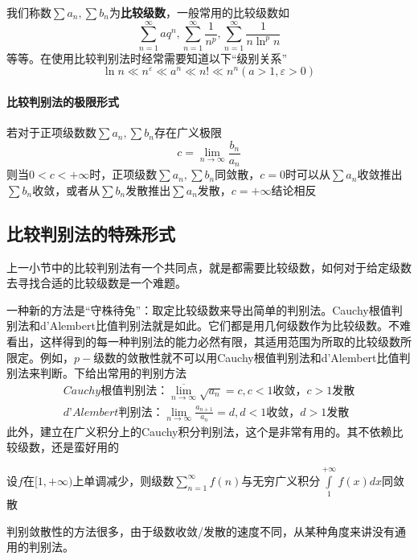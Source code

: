 \documentclass[lang=cn,10pt]{elegantbook}
\begin{document}
我们称数$\sum{a_n},\sum{b_n}$为\textbf{比较级数}，一般常用的比较级数如
\begin{equation*}
	\sum_{n=1}^{\infty}{aq^n},\sum_{n=1}^{\infty}{\frac{1}{n^p},\sum_{n=1}^{\infty}{\frac{1}{n\ln ^pn}}}
\end{equation*}
等等。在使用比较判别法时经常需要知道以下“级别关系”
\begin{equation*}
	\ln n\ll n^{\varepsilon}\ll a^n\ll n!\ll n^n\left( a>1,\varepsilon >0 \right) 
\end{equation*}
\paragraph{比较判别法的极限形式}
若对于正项级数数$\sum{a_n},\sum{b_n}$存在广义极限
\begin{equation*}
	c=\lim_{n\rightarrow \infty} \frac{b_n}{a_n}
\end{equation*}
则当$0<c<+\infty$时，正项级数$\sum{a_n},\sum{b_n}$同敛散，$c=0$时可以从$\sum{a_n}$收敛推出$\sum{b_n}$收敛，或者从$\sum{b_n}$发散推出$\sum{a_n}$发散，$c=+\infty$结论相反
\subsection{比较判别法的特殊形式}
上一小节中的比较判别法有一个共同点，就是都需要比较级数，如何对于给定级数去寻找合适的比较级数是一个难题。

一种新的方法是“守株待兔”：取定比较级数来导出简单的判别法。Cauchy根值判别法和d’Alembert比值判别法就是如此。它们都是用几何级数作为比较级数。不难看出，这样得到的每一种判别法的能力必然有限，其适用范围为所取的比较级数所限定。例如，$p-$级数的敛散性就不可以用Cauchy根值判别法和d’Alembert比值判别法来判断。下给出常用的判别方法
\begin{equation*}
	\begin{split}
		Cauchy\text{根值判别法：}\overline{\lim_{n\rightarrow \infty} }\sqrt{a_n}=c,c<1\text{收敛，}c>1\text{发散}
		\\
		d’Alembert\text{判别法：}\lim_{n\rightarrow \infty} \frac{a_{n+1}}{a_n}=d,d<1\text{收敛，}d>1\text{发散}
	\end{split}
\end{equation*}
此外，建立在广义积分上的Cauchy积分判别法，这个是非常有用的。其不依赖比较级数，还是蛮好用的
\begin{proposition}[Cauchy积分判别法]
	设$f$在$[1,+\infty)$上单调减少，则级数$\sum_{n=1}^{\infty}{f\left( n \right)}$与无穷广义积分$\int\limits_1^{+\infty}{f\left( x \right) dx}$同敛散
\end{proposition}
判别敛散性的方法很多，由于级数收敛/发散的速度不同，从某种角度来讲没有通用的判别法。
\end{document}
